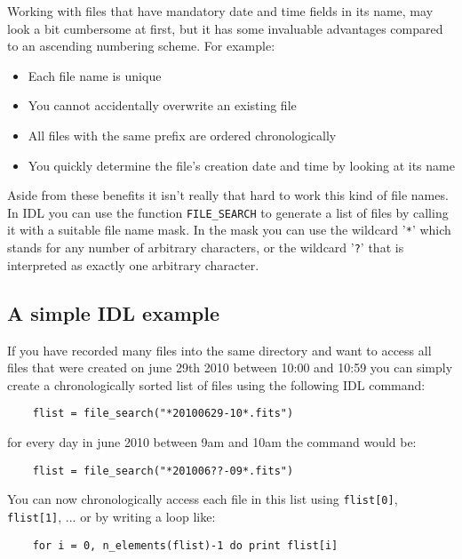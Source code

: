 \documentclass[11pt, a4paper]{scrartcl}
\begin{document}
Working with files that have mandatory date and time fields in its name, may look a bit cumbersome at first, but it has some invaluable advantages compared to an ascending numbering scheme. For example:
\begin{itemize}
  \item Each file name is unique
  \item You cannot accidentally overwrite an existing file
  \item All files with the same prefix are ordered chronologically
  \item You quickly determine the file's creation date and time by looking at its name
\end{itemize}
Aside from these benefits it isn't really that hard to work this kind of file names. In IDL you can use the function \texttt{FILE\_SEARCH} to generate a list of files by calling it with a suitable file name mask. In the mask you can use the wildcard '\texttt{*}' which stands for any number of arbitrary characters, or the wildcard '\texttt{?}' that is interpreted as exactly one arbitrary character.

\subsection{A simple IDL example}
If you have recorded many files into the same directory and want to access all files that were created on june 29th 2010 between 10:00 and 10:59 you can simply create a chronologically sorted list of files using the following IDL command:
\begin{verbatim}
    flist = file_search("*20100629-10*.fits")
\end{verbatim}
for every day in june 2010 between 9am and 10am the command would be:
\begin{verbatim}
    flist = file_search("*201006??-09*.fits")
\end{verbatim}
You can now chronologically access each file in this list using \texttt{flist[0]}, \texttt{flist[1]}, ... or by writing a loop like:
\begin{verbatim}
    for i = 0, n_elements(flist)-1 do print flist[i]
\end{verbatim}
\end{document}
